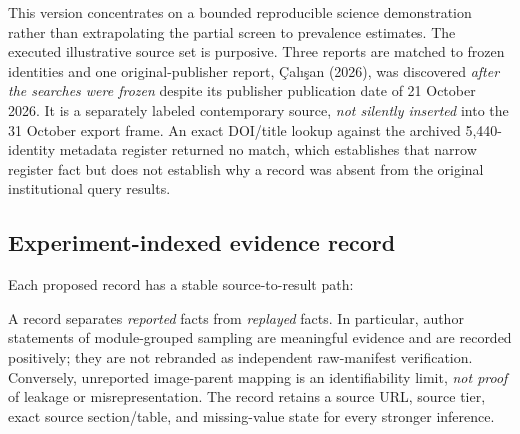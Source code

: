 \documentclass[10pt,a4paper]{article}
\begin{document}
This version concentrates on a bounded reproducible science demonstration rather than extrapolating the partial screen to prevalence estimates. The executed illustrative source set is purposive. Three reports are matched to frozen identities and one original-publisher report, \c{C}al{\i}\c{s}an (2026), was discovered \emph{after the searches were frozen} despite its publisher publication date of 21 October 2026. It is a separately labeled contemporary source, \emph{not silently inserted} into the 31 October export frame. An exact DOI/title lookup against the archived 5,440-identity metadata register returned no match, which establishes that narrow register fact but does not establish why a record was absent from the original institutional query results.

\subsection{Experiment-indexed evidence record}
Each proposed record has a stable source-to-result path:
\begin{center}
\end{center}
A record separates \emph{reported} facts from \emph{replayed} facts. In particular, author statements of module-grouped sampling are meaningful evidence and are recorded positively; they are not rebranded as independent raw-manifest verification. Conversely, unreported image-parent mapping is an identifiability limit, \emph{not proof} of leakage or misrepresentation. The record retains a source URL, source tier, exact source section/table, and missing-value state for every stronger inference.
\end{document}
